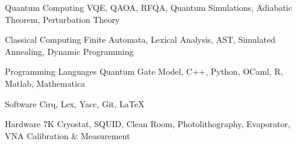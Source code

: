 

\begin{cvskills}

  \cvskill
    {Quantum Computing}
    {VQE, QAOA, RFQA, Quantum Simulations, Adiabatic Theorem, Perturbation Theory}

  \cvskill
    {Classical Computing}
    {Finite Automata, Lexical Analysis, AST, Simulated Annealing, Dynamic Programming}

  \cvskill
    {Programming Languages}
    {Quantum Gate Model, C++, Python, OCaml, R, Matlab, Mathematica}

  \cvskill
    {Software}
    {Cirq, Lex, Yacc, Git, LaTeX}

  \cvskill
    {Hardware}
    {7K Cryostat, SQUID, Clean Room, Photolithography, Evaporator, VNA Calibration \& Measurement}

\end{cvskills}
